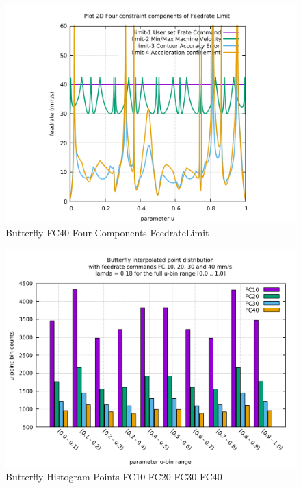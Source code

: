 \begin{figure}
	\caption     {Butterfly FC40 Four Components FeedrateLimit}
	\label{34-img-Butterfly-FC40-Four-Components-FeedrateLimit.pdf}
	\includegraphics[width=1.00\textwidth]{Chap4/appendix/app-Butterfly/plots/34-img-Butterfly-FC40-Four-Components-FeedrateLimit.pdf}
\end{figure}


\clearpage
\pagebreak

\begin{figure}
	\centering
	\caption     {Butterfly Histogram Points FC10 FC20 FC30 FC40}
	\label{35-img-Butterfly-Histogram-Points-FC10-FC20-FC30-FC40.pdf}
\includegraphics[width=1.00\textwidth]{Chap4/appendix/app-Butterfly/plots/35-img-Butterfly-Histogram-Points-FC10-FC20-FC30-FC40.pdf} 
\end{figure}


